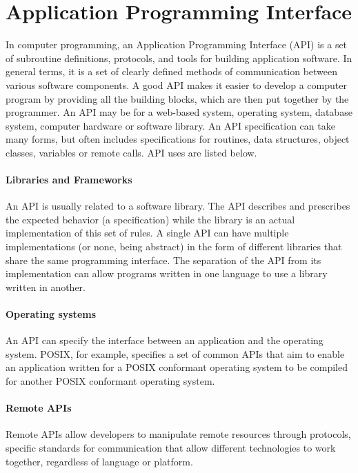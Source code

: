 \section{Application Programming Interface}
In computer programming, an Application Programming Interface (API) is a set of subroutine definitions, protocols, and tools for building application software. In general terms, it is a set of clearly defined methods of communication between various software components. A good API makes it easier to develop a computer program by providing all the building blocks, which are then put together by the programmer. An API may be for a web-based system, operating system, database system, computer hardware or software library. An API specification can take many forms, but often includes specifications for routines, data structures, object classes, variables or remote calls. API uses are listed below.

\paragraph{Libraries and Frameworks}
An API is usually related to a software library. The API describes and prescribes the expected behavior (a specification) while the library is an actual implementation of this set of rules. A single API can have multiple implementations (or none, being abstract) in the form of different libraries that share the same programming interface. The separation of the API from its implementation can allow programs written in one language to use a library written in another. 

\paragraph{Operating systems}
An API can specify the interface between an application and the operating system. POSIX, for example, specifies a set of common APIs that aim to enable an application written for a POSIX conformant operating system to be compiled for another POSIX conformant operating system.

\paragraph{Remote APIs}
Remote APIs allow developers to manipulate remote resources through protocols, specific standards for communication that allow different technologies to work together, regardless of language or platform.


